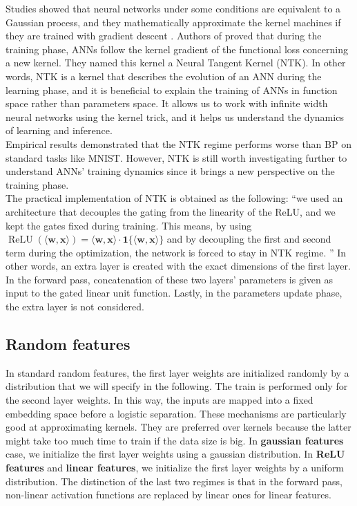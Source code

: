 \documentclass[a4paper, nobind]{templates/ociamthesis}
\begin{document}
Studies showed that neural networks under some conditions are equivalent to a Gaussian process, and they mathematically approximate the kernel machines if they are trained with gradient descent \cite{lee2018deep, domingos2020model}. Authors of \cite{DBLP:journals/corr/abs-1806-07572} proved that during the training phase, ANNs follow the kernel gradient of the functional loss concerning a new kernel. They named this kernel a Neural Tangent Kernel (NTK). In other words, NTK is a kernel that describes the evolution of an ANN during the learning phase, and it is beneficial to explain the training of ANNs in function space rather than parameters space. It allows us to work with infinite width neural networks using the kernel trick, and it helps us understand the dynamics of learning and inference.\\
Empirical results demonstrated that the NTK regime performs worse than BP on standard tasks like MNIST. However, NTK is still worth investigating further to understand ANNs' training dynamics since it brings a new perspective on the training phase.\\
The practical implementation of NTK is obtained as the following: ``we used an architecture that decouples the gating from the linearity of the ReLU, and we kept the gates fixed during training. This means, by using \(\operatorname{ReLU}(\langle\mathbf{w}, \mathbf{x}\rangle)=\langle\mathbf{w}, \mathbf{x}\rangle \cdot \mathbf{1}\{\langle\mathbf{w}, \mathbf{x}\rangle\}\) and by decoupling the first and second term during the optimization, the network is forced to stay in NTK regime. \cite{DBLP:journals/corr/abs-2002-07400}'' In other words, an extra layer is created with the exact dimensions of the first layer. In the forward pass, concatenation of these two layers' parameters is given as input to the gated linear unit function. Lastly, in the parameters update phase, the extra layer is not considered.

\hypertarget{random-features}{%
\subsection{Random features}\label{random-features}}

In standard random features, the first layer weights are initialized randomly by a distribution that we will specify in the following. The train is performed only for the second layer weights. In this way, the inputs are mapped into a fixed embedding space before a logistic separation. These mechanisms are particularly good at approximating kernels. They are preferred over kernels because the latter might take too much time to train if the data size is big. In \textbf{gaussian features} case, we initialize the first layer weights using a gaussian distribution. In \textbf{ReLU features} and \textbf{linear features}, we initialize the first layer weights by a uniform distribution. The distinction of the last two regimes is that in the forward pass, non-linear activation functions are replaced by linear ones for linear features.
\end{document}
